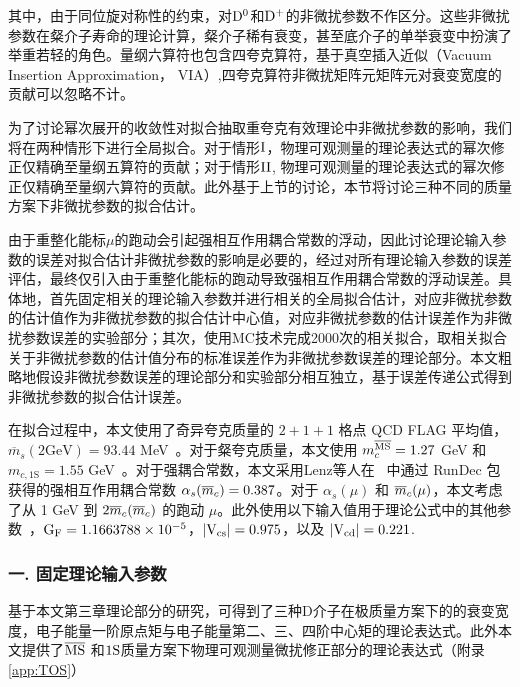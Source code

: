 其中，由于同位旋对称性的约束，对$\mathrm{D^{0}}$和$\mathrm{D^{+}}$的非微扰参数不作区分。这些非微扰参数在粲介子寿命的理论计算，粲介子稀有衰变，甚至底介子的单举衰变中扮演了举重若轻的角色。量纲六算符也包含四夸克算符，基于真空插入近似（Vacuum Insertion Approximation， VIA）,四夸克算符非微扰矩阵元矩阵元对衰变宽度的贡献可以忽略不计。

为了讨论幂次展开的收敛性对拟合抽取重夸克有效理论中非微扰参数的影响，我们将在两种情形下进行全局拟合。对于情形$\mathrm{I}$，物理可观测量的理论表达式的幂次修正仅精确至量纲五算符的贡献；对于情形$\mathrm{II}$, 物理可观测量的理论表达式的幂次修正仅精确至量纲六算符的贡献。此外基于上节的讨论，本节将讨论三种不同的质量方案下非微扰参数的拟合估计。

由于重整化能标$\mu$的跑动会引起强相互作用耦合常数的浮动，因此讨论理论输入参数的误差对拟合估计非微扰参数的影响是必要的，经过对所有理论输入参数的误差评估，最终仅引入由于重整化能标的跑动导致强相互作用耦合常数的浮动误差。具体地，首先固定相关的理论输入参数并进行相关的全局拟合估计，对应非微扰参数的估计值作为非微扰参数的拟合估计中心值，对应非微扰参数的估计误差作为非微扰参数误差的实验部分；其次，使用MC技术完成2000次的相关拟合，取相关拟合关于非微扰参数的估计值分布的标准误差作为非微扰参数误差的理论部分。本文粗略地假设非微扰参数误差的理论部分和实验部分相互独立，基于误差传递公式得到非微扰参数的拟合估计误差。

在拟合过程中，本文使用了奇异夸克质量的 $2+1+1$ 格点 QCD FLAG 平均值，$\overline{m}_s(2 \mathrm{GeV}) = 93.44$ MeV~\cite{FlavourLatticeAveragingGroup:2019iem}。对于粲夸克质量，本文使用 $m_{c}^{\overline{\mathrm{MS}}} = 1.27$ GeV 和 $m_{c,\mathrm{1S}} = 1.55$ GeV~\cite{ParticleDataGroup:2024cfk}。对于强耦合常数，本文采用Lenz等人在~\cite{King:2021xqp} 中通过 RunDec 包~\cite{Herren:2017osy} 获得的强相互作用耦合常数 $\alpha_{s}(\overline{m}_{c}) = 0.387$。对于 $\alpha_s(\mu)$ 和 $\overline{m}_c(\mu)$，本文考虑了从 1 GeV 到 $2\overline{m}_{c}(\overline{m}_{c})$ 的跑动 $\mu$。此外使用以下输入值用于理论公式中的其他参数~\cite{ParticleDataGroup:2024cfk}，$\mathrm{G_F} = 1.1663788 \times 10^{-5}$，$\mathrm{|V_{cs}|} = 0.975$，以及 $\mathrm{|V_{cd}|} = 0.221$.

\subsubsection{一. 固定理论输入参数}
基于本文第三章理论部分的研究，可得到了三种D介子在极质量方案下的的衰变宽度，电子能量一阶原点矩与电子能量第二、三、四阶中心矩的理论表达式。此外本文提供了$\overline{\mathrm{MS}}$ 和$\mathrm{1S}$质量方案下物理可观测量微扰修正部分的理论表达式（附录\ref{app:TOS}）


